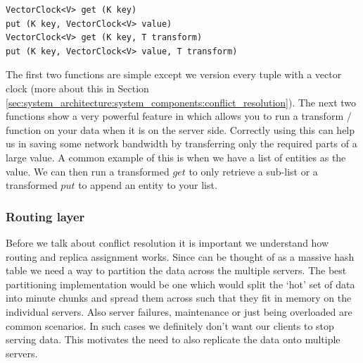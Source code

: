 \documentclass[10pt,twocolumn,preprint,nonatbib,numbers]{sigplanconf}
\begin{document}
\scriptsize
\begin{verbatim}
VectorClock<V> get (K key)
put (K key, VectorClock<V> value)
VectorClock<V> get (K key, T transform)
put (K key, VectorClock<V> value, T transform)
\end{verbatim}
\normalsize

The first two functions are simple except we version every tuple with a vector clock (more about this in Section \ref{sec:system_architecture:system_components:conflict_resolution}). The next two functions show a very powerful feature in \projectname{} which allows you to run a transform / function on your data when it is on the server side. Correctly using this can help us in saving some network bandwidth by transferring only the required parts of a large value. A common example of this is when we have a list of entities as the value. We can then run a transformed $get$ to only retrieve a sub-list or a transformed $put$ to append an entity to your list. 


\subsubsection {Routing layer }  
\label{sec:system_architecture:system_components:routing_layer}

Before we talk about conflict resolution it is important we understand how routing and replica assignment works. Since \projectname{} can be thought of as a massive hash table we need a way to partition the data across the multiple servers. The best partitioning implementation would be one which would split the `hot' set of data into minute chunks and spread them across such that they fit in memory on the individual servers. Also server failures, maintenance or just being overloaded are common scenarios. In such cases we definitely don't want our clients to stop serving data. This motivates the need to also replicate the data onto multiple servers. 
\end{document}

